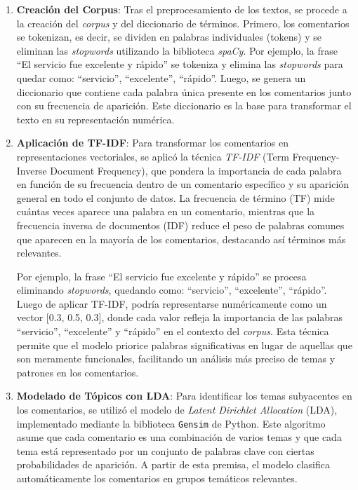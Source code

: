 \documentclass{matematicasud}
\begin{document}
\begin{enumerate}
    
    \item \textbf{Creación del Corpus}: Tras el preprocesamiento de los textos, se procede a la creación del \textit{corpus} y del diccionario de términos. Primero, los comentarios se tokenizan, es decir, se dividen en palabras individuales (tokens) y se eliminan las \textit{stopwords} utilizando la biblioteca \textit{spaCy}. Por ejemplo, la frase ``El servicio fue excelente y rápido'' se tokeniza y elimina las \textit{stopwords} para quedar como: ``servicio'', ``excelente'', ``rápido''. Luego, se genera un diccionario que contiene cada palabra única presente en los comentarios junto con su frecuencia de aparición. Este diccionario es la base para transformar el texto en su representación numérica.
    
    \item \textbf{Aplicación de TF-IDF}: Para transformar los comentarios en representaciones vectoriales, se aplicó la técnica \textit{TF-IDF} (Term Frequency-Inverse Document Frequency), que pondera la importancia de cada palabra en función de su frecuencia dentro de un comentario específico y su aparición general en todo el conjunto de datos. La frecuencia de término (TF) mide cuántas veces aparece una palabra en un comentario, mientras que la frecuencia inversa de documentos (IDF) reduce el peso de palabras comunes que aparecen en la mayoría de los comentarios, destacando así términos más relevantes.

    Por ejemplo, la frase ``El servicio fue excelente y rápido'' se procesa eliminando \textit{stopwords}, quedando como: ``servicio'', ``excelente'', ``rápido''. Luego de aplicar TF-IDF, podría representarse numéricamente como un vector [0.3, 0.5, 0.3], donde cada valor refleja la importancia de las palabras ``servicio'', ``excelente'' y ``rápido'' en el contexto del \textit{corpus}. Esta técnica permite que el modelo priorice palabras significativas en lugar de aquellas que son meramente funcionales, facilitando un análisis más preciso de temas y patrones en los comentarios.

    
    \item \textbf{Modelado de Tópicos con LDA}: Para identificar los temas subyacentes en los comentarios, se utilizó el modelo de \textit{Latent Dirichlet Allocation} (LDA), implementado mediante la biblioteca \texttt{Gensim} de Python. Este algoritmo asume que cada comentario es una combinación de varios temas y que cada tema está representado por un conjunto de palabras clave con ciertas probabilidades de aparición. A partir de esta premisa, el modelo clasifica automáticamente los comentarios en grupos temáticos relevantes.


\end{enumerate}
\end{document}
